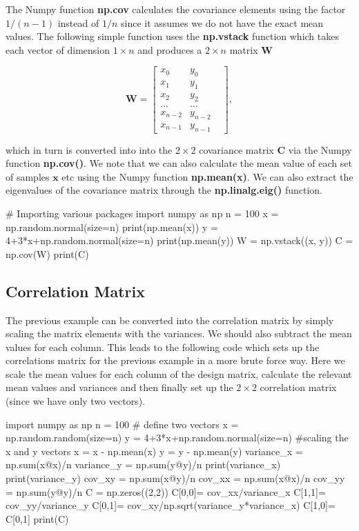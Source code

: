\documentclass[%
oneside,                 %
final,                   %
10pt]{article}
\begin{document}
The Numpy function \textbf{np.cov} calculates the covariance elements using
the factor $1/(n-1)$ instead of $1/n$ since it assumes we do not have
the exact mean values.  The following simple function uses the
\textbf{np.vstack} function which takes each vector of dimension $1\times n$
and produces a $2\times n$ matrix $\bm{W}$


\[
\bm{W} = \begin{bmatrix} x_0 & y_0 \\
                          x_1 & y_1 \\
                          x_2 & y_2\\
                          \dots & \dots \\
                          x_{n-2} & y_{n-2}\\
                          x_{n-1} & y_{n-1} & 
             \end{bmatrix},
\]

which in turn is converted into into the $2\times 2$ covariance matrix
$\bm{C}$ via the Numpy function \textbf{np.cov()}. We note that we can also calculate
the mean value of each set of samples $\bm{x}$ etc using the Numpy
function \textbf{np.mean(x)}. We can also extract the eigenvalues of the
covariance matrix through the \textbf{np.linalg.eig()} function.

\bpycod
# Importing various packages
import numpy as np
n = 100
x = np.random.normal(size=n)
print(np.mean(x))
y = 4+3*x+np.random.normal(size=n)
print(np.mean(y))
W = np.vstack((x, y))
C = np.cov(W)
print(C)
\epycod

\subsection{Correlation Matrix}

The previous example can be converted into the correlation matrix by
simply scaling the matrix elements with the variances.  We should also
subtract the mean values for each column. This leads to the following
code which sets up the correlations matrix for the previous example in
a more brute force way. Here we scale the mean values for each column of the design matrix, calculate the relevant mean values and variances and then finally set up the $2\times 2$ correlation matrix (since we have only two vectors). 

\bpycod
import numpy as np
n = 100
# define two vectors                                                                                           
x = np.random.random(size=n)
y = 4+3*x+np.random.normal(size=n)
#scaling the x and y vectors                                                                                   
x = x - np.mean(x)
y = y - np.mean(y)
variance_x = np.sum(x@x)/n
variance_y = np.sum(y@y)/n
print(variance_x)
print(variance_y)
cov_xy = np.sum(x@y)/n
cov_xx = np.sum(x@x)/n
cov_yy = np.sum(y@y)/n
C = np.zeros((2,2))
C[0,0]= cov_xx/variance_x
C[1,1]= cov_yy/variance_y
C[0,1]= cov_xy/np.sqrt(variance_y*variance_x)
C[1,0]= C[0,1]
print(C)
\epycod
\end{document}
